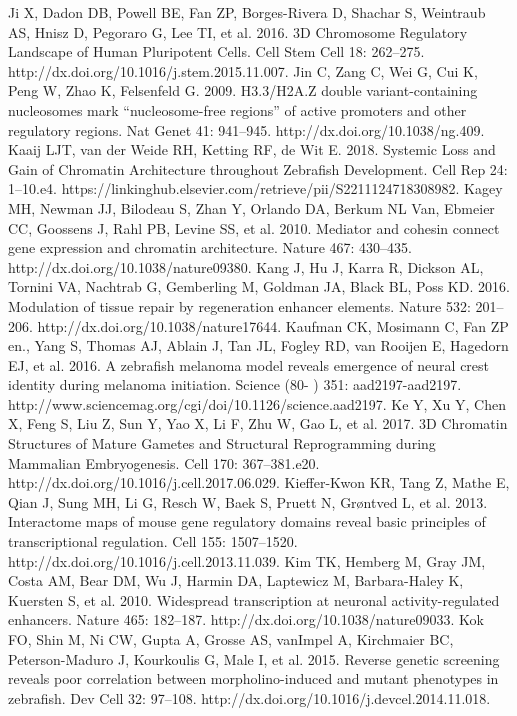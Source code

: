 \begin{thebibliography}{1}
	 Ji X, Dadon DB, Powell BE, Fan ZP, Borges-Rivera D, Shachar S, Weintraub AS, Hnisz D, Pegoraro G, Lee TI, et al. 2016. 3D Chromosome Regulatory Landscape of Human Pluripotent Cells. Cell Stem Cell 18: 262–275. http://dx.doi.org/10.1016/j.stem.2015.11.007.
	 Jin C, Zang C, Wei G, Cui K, Peng W, Zhao K, Felsenfeld G. 2009. H3.3/H2A.Z double variant-containing nucleosomes mark “nucleosome-free regions” of active promoters and other regulatory regions. Nat Genet 41: 941–945. http://dx.doi.org/10.1038/ng.409.
	 Kaaij LJT, van der Weide RH, Ketting RF, de Wit E. 2018. Systemic Loss and Gain of Chromatin Architecture throughout Zebrafish Development. Cell Rep 24: 1–10.e4. https://linkinghub.elsevier.com/retrieve/pii/S2211124718308982.
	 Kagey MH, Newman JJ, Bilodeau S, Zhan Y, Orlando DA, Berkum NL Van, Ebmeier CC, Goossens J, Rahl PB, Levine SS, et al. 2010. Mediator and cohesin connect gene expression and chromatin architecture. Nature 467: 430–435. http://dx.doi.org/10.1038/nature09380.
	 Kang J, Hu J, Karra R, Dickson AL, Tornini VA, Nachtrab G, Gemberling M, Goldman JA, Black BL, Poss KD. 2016. Modulation of tissue repair by regeneration enhancer elements. Nature 532: 201–206. http://dx.doi.org/10.1038/nature17644.
	 Kaufman CK, Mosimann C, Fan ZP en., Yang S, Thomas AJ, Ablain J, Tan JL, Fogley RD, van Rooijen E, Hagedorn EJ, et al. 2016. A zebrafish melanoma model reveals emergence of neural crest identity during melanoma initiation. Science (80- ) 351: aad2197-aad2197. http://www.sciencemag.org/cgi/doi/10.1126/science.aad2197.
	 Ke Y, Xu Y, Chen X, Feng S, Liu Z, Sun Y, Yao X, Li F, Zhu W, Gao L, et al. 2017. 3D Chromatin Structures of Mature Gametes and Structural Reprogramming during Mammalian Embryogenesis. Cell 170: 367–381.e20. http://dx.doi.org/10.1016/j.cell.2017.06.029.
	 Kieffer-Kwon KR, Tang Z, Mathe E, Qian J, Sung MH, Li G, Resch W, Baek S, Pruett N, Grøntved L, et al. 2013. Interactome maps of mouse gene regulatory domains reveal basic principles of transcriptional regulation. Cell 155: 1507–1520. http://dx.doi.org/10.1016/j.cell.2013.11.039.
	 Kim TK, Hemberg M, Gray JM, Costa AM, Bear DM, Wu J, Harmin DA, Laptewicz M, Barbara-Haley K, Kuersten S, et al. 2010. Widespread transcription at neuronal activity-regulated enhancers. Nature 465: 182–187. http://dx.doi.org/10.1038/nature09033.
	 Kok FO, Shin M, Ni CW, Gupta A, Grosse AS, vanImpel A, Kirchmaier BC, Peterson-Maduro J, Kourkoulis G, Male I, et al. 2015. Reverse genetic screening reveals poor correlation between morpholino-induced and mutant phenotypes in zebrafish. Dev Cell 32: 97–108. http://dx.doi.org/10.1016/j.devcel.2014.11.018.

\end{thebibliography}

